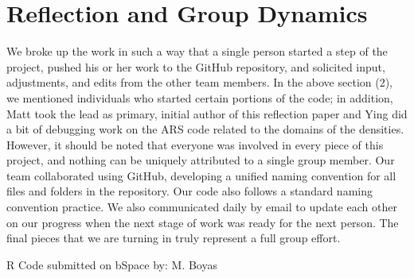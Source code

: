 \documentclass{article}
\begin{document}
\section{Reflection and Group Dynamics}
We broke up the work in such a way that a single person started a step of the project, pushed his or her work to the GitHub repository, and solicited input, adjustments, and edits from the other team members.  In the above section (2), we mentioned individuals who started certain portions of the code; in addition, Matt took the lead as primary, initial author of this reflection paper and Ying did a bit of debugging work on the ARS code related to the domains of the densities.  However, it should be noted that everyone was involved in every piece of this project, and nothing can be uniquely attributed to a single group member.  Our team collaborated using GitHub, developing a unified naming convention for all files and folders in the repository. Our code also follows a standard naming convention practice.  We also communicated daily by email to update each other on our progress when the next stage of work was ready for the next person. The final pieces that we are turning in truly represent a full group effort. 

R Code submitted on bSpace by: M. Boyas
\end{document}
